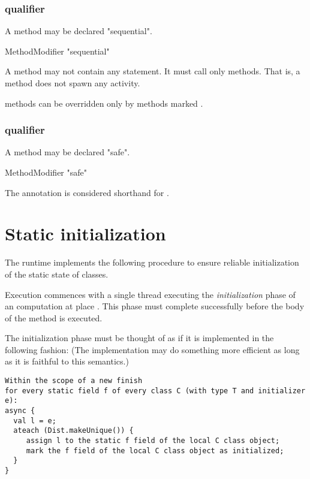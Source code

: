 \subsubsection{ qualifier}
\label{SequentialAnnotation}
\label{SequentialMethod}

A method may be declared \xcd"sequential".

\begin{grammar}
  MethodModifier \: \xcd"sequential"  
\end{grammar}

A  method may not contain any 
statement. It must call only  methods. That is, a
 method does not spawn any activity.

 methods can be overridden only by methods marked .

\subsubsection{ qualifier}
\label{SafeAnnotation}
\label{SafeMethod}

A method may be declared \xcd"safe".

\begin{grammar}
  MethodModifier \: \xcd"safe"  
\end{grammar}

The  annotation is considered shorthand for .


\section{Static initialization}
\label{StaticInitialization}
The \Xten{} runtime implements the following procedure to ensure
reliable initialization of the static state of classes.


Execution commences with a single thread executing the
\emph{initialization} phase of an \Xten{} computation at place . This
phase must complete successfully before the body of the  method is
executed.

The initialization phase must be thought of as if it is implemented in
the following fashion: (The implementation may do something more
efficient as long as it is faithful to this semantics.)

\begin{verbatim}
Within the scope of a new finish
for every static field f of every class C (with type T and initializer e):
async {
  val l = e; 
  ateach (Dist.makeUnique()) {
     assign l to the static f field of the local C class object;
     mark the f field of the local C class object as initialized;
  }
}
\end{verbatim}

